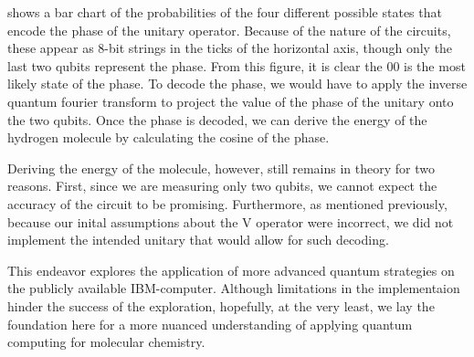 \documentclass{article}
\begin{document}
 shows a bar chart of the probabilities of the four
different possible states that encode the phase of the unitary
operator. Because of the nature of the circuits, these appear as 8-bit
strings in the ticks of the horizontal axis, though only the last two
qubits represent the phase. From this figure, it is clear the 00 is the
most likely state of the phase. To decode the phase, we would have to
apply the inverse quantum fourier transform to project the value of
the phase of the unitary onto the two qubits. Once the phase is
decoded, we can derive the energy of the hydrogen molecule by
calculating the cosine of the phase.

Deriving the energy of the molecule, however, still remains in theory
for two reasons. First, since we are measuring only two qubits, we
cannot expect the accuracy of the circuit to be
promising. Furthermore, as mentioned previously, because our inital
assumptions about the V operator were incorrect, we did not implement
the intended unitary that would allow for such decoding.

This endeavor explores the application of more advanced quantum
strategies on the publicly available IBM-computer. Although
limitations in the implementaion hinder the success of the
exploration, hopefully, at the very least, we lay the foundation here
for a more nuanced understanding of applying quantum computing for
molecular chemistry.



\printbibliography
\end{document}
